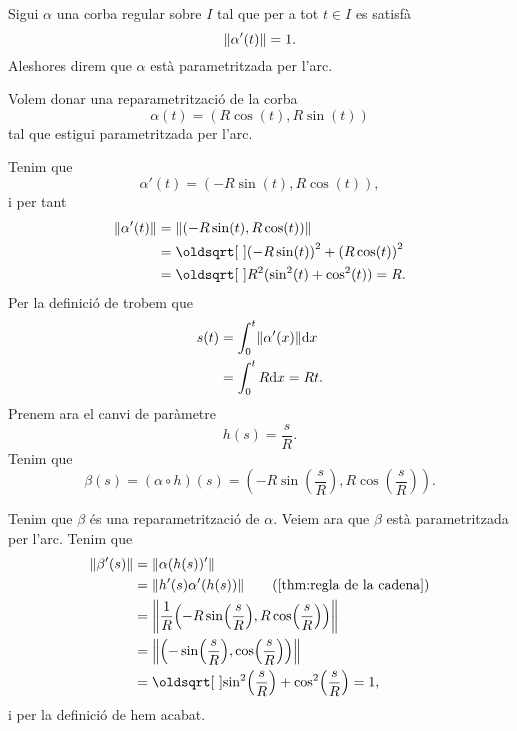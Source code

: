 \documentclass[../Apunts.tex]{subfiles}
\begin{document}
	\begin{definition}
		\label{def:corba parametritzada per l'arc}
		Sigui \(\alpha\) una corba regular sobre \(I\) tal que per a tot \(t\in I\) es satisfà
		\[\norm{\alpha'(t)}=1.\]
		Aleshores direm que \(\alpha\) està parametritzada per l'arc.
	\end{definition}
	\begin{example} %
		\label{ex:reparametrització per l'arc del cercle de radi R}
		Volem donar una reparametrització de la corba
		\[\alpha(t)=(R\cos(t),R\sin(t))\]
		tal que estigui parametritzada per l'arc.
		\begin{solution}
			Tenim que
			\[\alpha'(t)=(-R\sin(t),R\cos(t)),\]
			i per tant
			\begin{align*}
				\norm{\alpha'(t)}&=\norm{(-R\sin(t),R\cos(t))} \\
				&=\sqrt{{(-R\sin(t))}^{2}+{(R\cos(t))}^{2}} \\
				&=\sqrt{R^{2}(\sin^{2}(t)+\cos^{2}(t))}=R.
			\end{align*}
			Per la definició de  trobem que
			\begin{align*}
				s(t)&=\int_{0}^{t}\norm{\alpha'(x)}\diff x \\
				&=\int_{0}^{t}R\diff x=Rt.
			\end{align*}
			Prenem ara el canvi de paràmetre
			\[h(s)=\frac{s}{R}.\]
			Tenim que
			\[\beta(s)=(\alpha\circ h)(s)=\left(-R\sin\left(\frac{s}{R}\right),R\cos\left(\frac{s}{R}\right)\right).\]
			
			Tenim que \(\beta\) és una reparametrització de \(\alpha\). Veiem ara que \(\beta\) està parametritzada per l'arc. Tenim que
			\begin{align*}
				\norm{\beta'(s)}&=\norm{\alpha(h(s))'} \\
				&=\norm{h'(s)\alpha'(h(s))} \tag{\ref{thm:regla de la cadena}}\\
				&=\norm{\frac{1}{R}\left(-R\sin\left(\frac{s}{R}\right),R\cos\left(\frac{s}{R}\right)\right)} \\
				&=\norm{\left(-\sin\left(\frac{s}{R}\right),\cos\left(\frac{s}{R}\right)\right)} \\
				&=\sqrt{\sin^{2}\left(\frac{s}{R}\right)+\cos^{2}\left(\frac{s}{R}\right)}=1,
			\end{align*}
			i per la definició de  hem acabat.
		\end{solution}
	\end{example}
\end{document}
